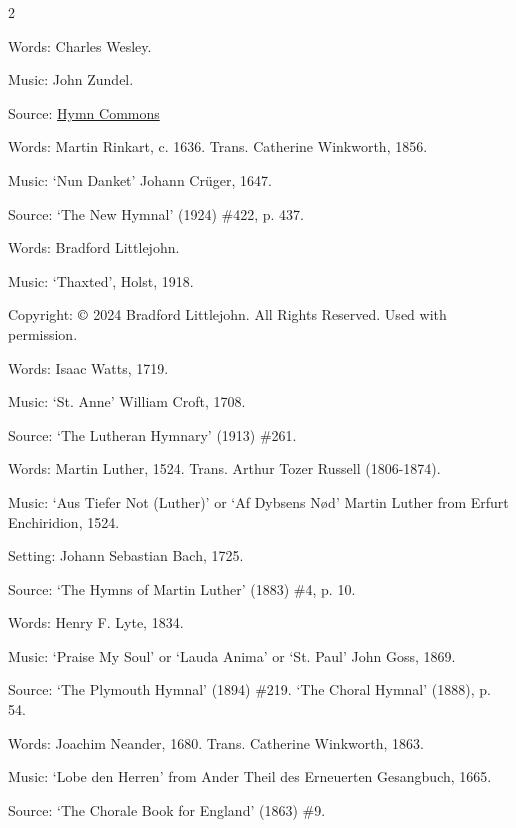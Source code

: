 \begin{multicols}{2}
\par\noindent
Words: Charles Wesley.
\par\noindent
Music: John Zundel.
\par\noindent
Source: \href{https://hymncommons.org}{Hymn Commons}


\par\noindent
Words: Martin Rinkart, c. 1636. Trans. Catherine Winkworth, 1856.
\par\noindent
Music: `Nun Danket' Johann Crüger, 1647. 
\par\noindent
Source: `The New Hymnal' (1924) \#422, p. 437.


\par\noindent
Words: Bradford Littlejohn.
\par\noindent
Music: `Thaxted', Holst, 1918.
\par\noindent
Copyright: $\copyright$ 2024 Bradford Littlejohn. All Rights Reserved. Used with permission.


\par\noindent
Words: Isaac Watts, 1719.
\par\noindent
Music: `St. Anne' William Croft, 1708.
\par\noindent
Source: `The Lutheran Hymnary' (1913) \#261.


\par\noindent
Words: Martin Luther, 1524. Trans. Arthur Tozer Russell (1806-1874). 
\par\noindent
Music: `Aus Tiefer Not (Luther)' or `Af Dybsens Nød' Martin Luther from Erfurt Enchiridion, 1524. 
\par\noindent
Setting: Johann Sebastian Bach, 1725.
\par\noindent
Source: `The Hymns of Martin Luther' (1883) \#4, p. 10.


\par\noindent
Words: Henry F. Lyte, 1834. 
\par\noindent
Music: `Praise My Soul' or `Lauda Anima' or `St. Paul' John Goss, 1869.
\par\noindent
Source: `The Plymouth Hymnal' (1894) \#219.  `The Choral Hymnal' (1888), p. 54.


\par\noindent
Words: Joachim Neander, 1680. Trans. Catherine Winkworth, 1863. 
\par\noindent
Music: `Lobe den Herren' from Ander Theil des Erneuerten Gesangbuch, 1665.
\par\noindent
Source: `The Chorale Book for England' (1863) \#9.



\end{multicols}
